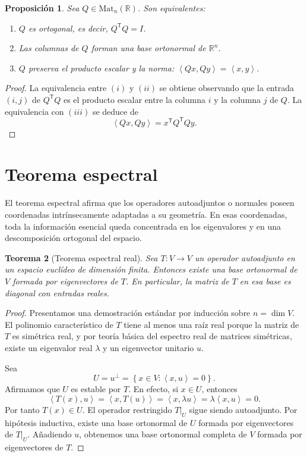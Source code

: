 \documentclass[10pt,a4paper,oneside]{article}
\theoremstyle{plain}
\newtheorem{theorem}{Teorema}[section]
\newtheorem{proposition}[theorem]{Proposición}
\theoremstyle{definition}
\theoremstyle{remark}
\newcommand{\R}{\mathbb{R}}
\newcommand{\Mat}{\mathrm{Mat}}
\newcommand{\transpose}{^{\mathsf{T}}}
\newcommand{\angles}[1]{\left\langle #1 \right\rangle}
\newcommand{\set}[1]{\left\{ #1 \right\}}
\begin{document}
\begin{proposition}
Sea \(Q\in\Mat_n(\R)\). Son equivalentes:
\begin{enumerate}[label=\textup{(\roman*)}]
\item \(Q\) es ortogonal, es decir, \(Q\transpose Q=I\).
\item Las columnas de \(Q\) forman una base ortonormal de \(\R^n\).
\item \(Q\) preserva el producto escalar y la norma: \(\angles{Qx,Qy}=\angles{x,y}\).
\end{enumerate}
\end{proposition}

\begin{proof}
La equivalencia entre \((i)\) y \((ii)\) se obtiene observando que la entrada \((i,j)\) de \(Q\transpose Q\) es el producto escalar entre la columna \(i\) y la columna \(j\) de \(Q\). La equivalencia con \((iii)\) se deduce de
\[
\angles{Qx,Qy}=x\transpose Q\transpose Qy.
\]
\end{proof}

\section{Teorema espectral}
\begin{ideaBox}
El teorema espectral afirma que los operadores autoadjuntos o normales poseen coordenadas intrínsecamente adaptadas a su geometría. En esas coordenadas, toda la información esencial queda concentrada en los eigenvalores y en una descomposición ortogonal del espacio.
\end{ideaBox}
\begin{theorem}[Teorema espectral real]
Sea \(T:V\to V\) un operador autoadjunto en un espacio euclídeo de dimensión finita. Entonces existe una base ortonormal de \(V\) formada por eigenvectores de \(T\). En particular, la matriz de \(T\) en esa base es diagonal con entradas reales.
\end{theorem}

\begin{proof}
Presentamos una demostración estándar por inducción sobre \(n=\dim V\). El polinomio característico de \(T\) tiene al menos una raíz real porque la matriz de \(T\) es simétrica real, y por teoría básica del espectro real de matrices simétricas, existe un eigenvalor real \(\lambda\) y un eigenvector unitario \(u\).

Sea
\[
U=u^{\perp}=\set{x\in V:\angles{x,u}=0}.
\]
Afirmamos que \(U\) es estable por \(T\). En efecto, si \(x\in U\), entonces
\[
\angles{T(x),u}=\angles{x,T(u)}=\angles{x,\lambda u}=\lambda\angles{x,u}=0.
\]
Por tanto \(T(x)\in U\). El operador restringido \(T|_U\) sigue siendo autoadjunto. Por hipótesis inductiva, existe una base ortonormal de \(U\) formada por eigenvectores de \(T|_U\). Añadiendo \(u\), obtenemos una base ortonormal completa de \(V\) formada por eigenvectores de \(T\). \end{proof}
\end{document}
